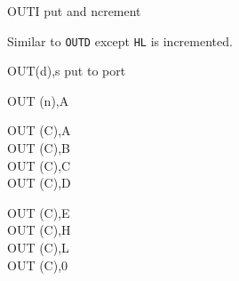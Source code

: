 \begin{basedescript}{
	\desclabelstyle{\multilinelabel}
	\desclabelwidth{3cm}}
	\begin{DetailItem}{OUTI}{}
		{put and ncrement}
		{\SymOUTI}

		Similar to {\tt OUTD} except {\tt HL} is incremented.
		
		\begin{DetailEffects}
			\FlagsOUTI
		\end{DetailEffects}

		\begin{DetailEffectsFlags}
		\end{DetailEffectsFlags}

		\begin{DetailTiming}
		\end{DetailTiming}

	\end{DetailItem}

	\pagebreak


	\begin{DetailItem}{OUT}{(d),s}
		{put to port}
		{}

		\begin{DetailVariants}
			OUT (n),A
			
			\columnbreak
			OUT (C),A\\
			OUT (C),B\\
			OUT (C),C\\
			OUT (C),D

			\columnbreak
			OUT (C),E\\
			OUT (C),H\\
			OUT (C),L\\
			OUT (C),0\UNDOC
		\end{DetailVariants}


\end{DetailItem}
\end{basedescript}
